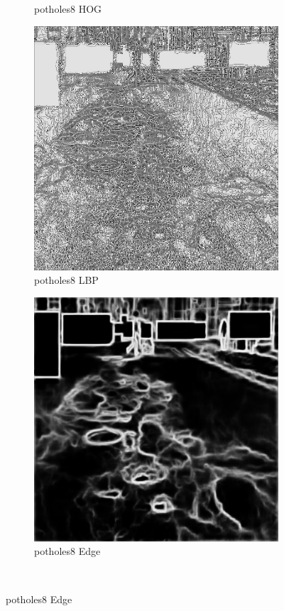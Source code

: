 \documentclass[a4paper, 10pt]{article}
\begin{document}
\begin{figure}[htbp]
\begin{subfigure}{0.24\textwidth}
			\caption*{potholes8 HOG}
			\label{fig: potholes8 filled HOG}
		\end{subfigure}	
		\begin{subfigure}{0.24\textwidth}
			\includegraphics[width=\linewidth]{picture/alldata_filled_lbp/potholes8}
			\caption*{potholes8 LBP}
			\label{fig: potholes8 filled LBP}
		\end{subfigure}
		\begin{subfigure}{0.24\textwidth}
			\includegraphics[width=\linewidth]{picture/alldata_filled_edge/potholes8}
			\caption*{potholes8 Edge}
			\label{fig: potholes8 filled Edge}
		\end{subfigure} \\
		

\end{figure}
\end{document}
